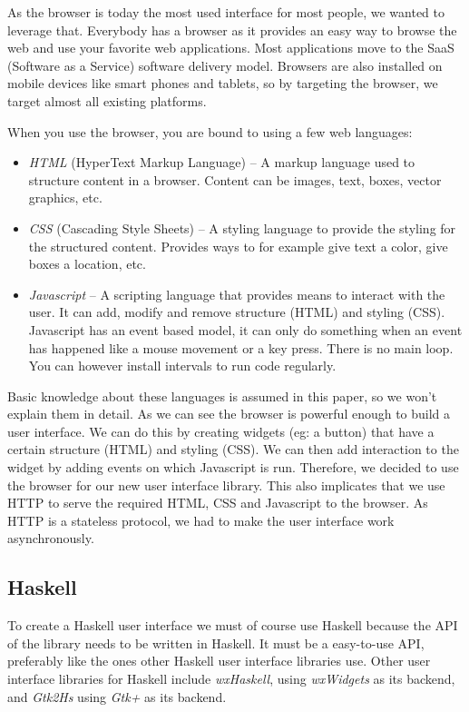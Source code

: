 \documentclass[11pt]{article}
\begin{document}
As the browser is today the most used interface for most people, we wanted to leverage that.
Everybody has a browser as it provides an easy way to browse the web and use your favorite web applications.
Most applications move to the SaaS (Software as a Service) software delivery model.
Browsers are also installed on mobile devices like smart phones and tablets, so by targeting the browser, we target almost all existing platforms.

When you use the browser, you are bound to using a few web languages:

\begin{itemize}
\item \textit{HTML} (HyperText Markup Language) -- A markup language used to structure content in a browser.
Content can be images, text, boxes, vector graphics, etc.
\item \textit{CSS} (Cascading Style Sheets) -- A styling language to provide the styling for the structured content.
Provides ways to for example give text a color, give boxes a location, etc.
\item \textit{Javascript} -- A scripting language that provides means to interact with the user.
It can add, modify and remove structure (HTML) and styling (CSS). Javascript has an event based model, it can only do something when an event has happened like a mouse movement or a key press.
There is no main loop.
You can however install intervals to run code regularly.
\end{itemize}

Basic knowledge about these languages is assumed in this paper, so we won't explain them in detail.
As we can see the browser is powerful enough to build a user interface.
We can do this by creating widgets (eg: a button) that have a certain structure (HTML) and styling (CSS).
We can then add interaction to the widget by adding events on which Javascript is run.
Therefore, we decided to use the browser for our new user interface library.
This also implicates that we use HTTP to serve the required HTML, CSS and Javascript to the browser.
As HTTP is a stateless protocol, we had to make the user interface work asynchronously.

\subsection{Haskell}

To create a Haskell user interface we must of course use Haskell because the API of the library needs to be written in Haskell.
It must be a easy-to-use API, preferably like the ones other Haskell user interface libraries use.
Other user interface libraries for Haskell include \textit{wxHaskell}, using \textit{wxWidgets} as its backend, and \textit{Gtk2Hs} using \textit{Gtk+} as its backend.
\end{document}
